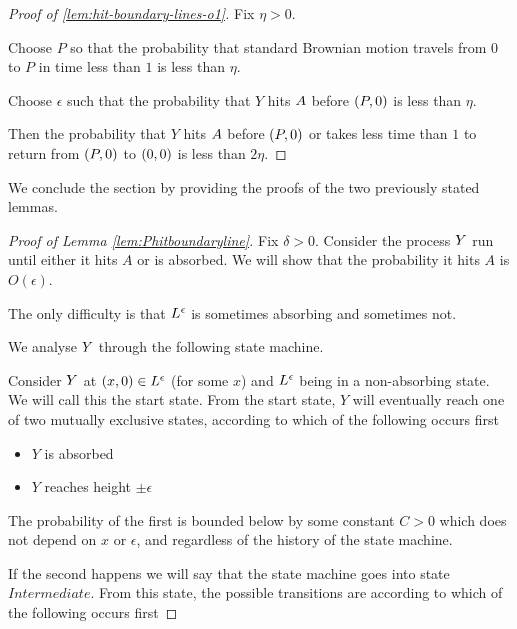 {\begin{proof}[Proof of \ref{lem:hit-boundary-lines-o1}]
  Fix $\eta > 0$.

  Choose $P$ so that the probability that standard Brownian motion
  travels from $0$ to $P$ in time less than $1$ is less than
  $\eta$.

  Choose $\epsilon$ such that the probability that $Y$ hits
  $A$ before $(P,0)$ is less than $\eta$.

  Then the probability that $Y$ hits $A$ before $(P,0)$
  or takes less time than $1$ to return from $(P,0)$ to $(0,0)$ is
  less than $2\eta$.
\end{proof}

We conclude the section by providing the proofs of the two previously
stated lemmas.

\begin{proof}[Proof of Lemma \ref{lem:Phitboundaryline}]
Fix $\delta > 0$.  Consider the process $Y$ run until either
it hits $A$ or is absorbed.  We will show that the probability it
hits $A$ is $O(\epsilon)$.

The only difficulty is that $L^\epsilon$ is sometimes absorbing and
sometimes not.

We analyse $Y$ through the following state machine.

Consider $Y$ at $(x,0) \in L^\epsilon$ (for some $x$) and $L^\epsilon$ being in
a non-absorbing state.  We will call this the start state.  From the
start state, $Y$ will eventually reach one of two mutually exclusive
states, according to which of the following occurs first

\newcommand{\intermediatelines}{I}

\begin{itemize}
\item $Y$ is absorbed
\item $Y$ reaches height $\pm\epsilon$
\end{itemize}

The probability of the first is bounded below by some constant $C > 0$
which does not depend on $x$ or $\epsilon$, and regardless of the
history of the state machine.

\newcommand{\stateintermediate}{Intermediate}

If the second happens we will say that the state machine goes into
state $\stateintermediate$.  From this state, the possible transitions
are according to which of the following occurs first


\end{proof}}
